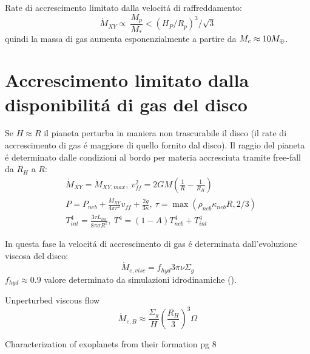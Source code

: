 Rate di accrescimento limitato dalla velocit\'a di raffreddamento:
\begin{equation}
\dot{M}_{XY}\propto\ \frac{M_p}{M_*}<(H_P/R_p)^3/\sqrt{3}
\end{equation}
quindi la massa di gas aumenta esponenzialmente a partire da $M_c\approx10M_{\oplus}{}$.

\begin{workout}

\end{workout}

\section{Accrescimento limitato dalla disponibilit\'a di gas del disco}

Se $H\approx R$ il pianeta perturba in maniera non trascurabile il disco (il rate di accrescimento di gas \'e maggiore di quello fornito dal disco). Il raggio del pianeta \'e determinato dalle condizioni al bordo per materia accresciuta tramite free-fall da $R_H$ a $R$:
\begin{align}
&\dot{M}_{XY}=\dot{M}_{XY,max},\ v_{ff}^2=2GM(\frac{1}{R}-\frac{1}{R_H})\\
&P=P_{neb}+\frac{\dot{M}_{XY}}{4\pi r^2}v_{ff}+\frac{2g}{3\kappa},\ \tau=\max{(\rho_{neb}\kappa_{neb}R,2/3)}\\
&T_{int}^4=\frac{3\tau L_{int}}{8\pi\sigma R^2},\ T^4=(1-A)T_{neb}^4+T_{int}^4
\end{align}

In questa fase la velocit\'a di accrescimento di gas \'e determinata dall'evoluzione viscosa del disco:
\begin{equation}
\dot{M}_{e,visc}=f_{hyd}3\pi\nu\Sigma_g
\end{equation}
$f_{hyd}\approx0.9$ valore determinato da simulazioni idrodinamiche (\cite{lubow1999disk}).

\begin{workout}
Unperturbed viscous flow
\begin{equation}
\dot{M}_{e,B}\approx\frac{\Sigma_g}{H}(\frac{R_H}{3})^3\Omega
\end{equation}
\end{workout}

\begin{workout}
Characterization of exoplanets from their formation pg 8
\end{workout}

